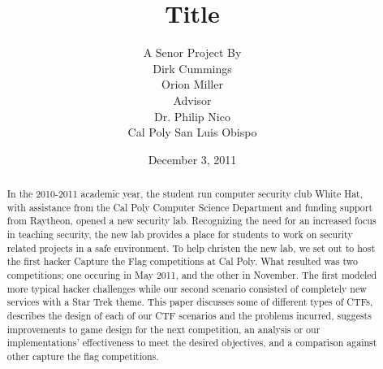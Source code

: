 \documentclass[10pt]{article}
\begin{document}
\title{\vfill Title}
\author{
 A Senor Project By \vspace{10pt} \\
 Dirk Cummings \\
 Orion Miller \vspace{10pt} \\
 Advisor \vspace{10pt} \\
 Dr. Philip Nico \\
 Cal Poly San Luis Obispo \vspace{10pt} \\ 
}
\date{December 3, 2011}

\maketitle

\vfill
\begin{abstract}
In the 2010-2011 academic year, the student run computer security club White
Hat, with assistance from the Cal Poly Computer Science Department and funding
support from Raytheon, opened a new security lab. Recognizing the need for an
increased focus in teaching security, the new lab provides a place for students
to work on security related projects in a safe environment. To help christen the
new lab, we set out to host the first hacker Capture the Flag competitions at
Cal Poly. What resulted was two competitions; one occuring in May 2011, and the
other in November. The first modeled more typical hacker challenges while our
second scenario consisted of completely new services with a Star Trek theme.
This paper discusses some of different types of CTFs, describes the design of
each of our CTF scenarios and the problems incurred, suggests improvements to
game design for the next competition, an analysis or our implementations'
effectiveness to meet the desired objectives, and a comparison against other
capture the flag competitions.
\end{abstract}

\thispagestyle{empty} %

\newpage

\thispagestyle{empty}  %
\tableofcontents

\newpage
\setcounter{page}{1}
\end{document}
